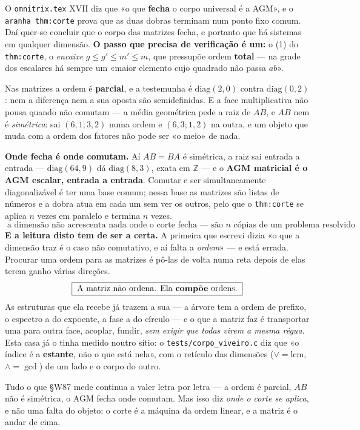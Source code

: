 \documentclass[11pt,a4paper]{article}
\newcommand{\code}[1]{\texttt{\small #1}}
\newcommand{\Z}{\ensuremath{\mathbb{Z}}}
\begin{document}
\noindent O \code{omnitrix.tex} XVII diz que «o que \textbf{fecha} o corpo universal
é a AGM», e o \code{aranha thm:corte} prova que as duas dobras terminam num ponto
fixo comum. Daí quer-se concluir que o corpo das matrizes fecha, e portanto que há
sistemas em qualquer dimensão. \textbf{O passo que precisa de verificação é um:} o
(1) do \code{thm:corte}, o \emph{encaixe} $g\le g'\le m'\le m$, que pressupõe ordem
\textbf{total} --- na grade dos escalares há sempre um «maior elemento cujo quadrado
não passa $ab$».

\medskip\noindent Nas matrizes a ordem é \textbf{parcial}, e a testemunha é
$\mathrm{diag}(2,0)$ contra $\mathrm{diag}(0,2)$: nem a diferença nem a sua oposta
são semidefinidas. E a face multiplicativa não pousa quando não comutam --- a média
geométrica pede a raiz de $AB$, e $AB$ nem é \emph{simétrica}: sai $(6,1;3,2)$ numa
ordem e $(6,3;1,2)$ na outra, e um objeto que muda com a ordem dos fatores não pode
ser «o meio» de nada.

\medskip\noindent\textbf{Onde fecha é onde comutam.} Aí $AB=BA$ é simétrica, a raiz
sai entrada a entrada --- $\mathrm{diag}(64,9)$ dá $\mathrm{diag}(8,3)$, exata em
$\Z$ --- e o \textbf{AGM matricial é o AGM escalar, entrada a entrada}. Comutar e ser
simultaneamente diagonalizável é ter uma base comum; nessa base as matrizes são
listas de números e a dobra atua em cada um sem ver os outros, pelo que o
\code{thm:corte} se aplica $n$ vezes em paralelo e termina $n$ vezes.
\[
\boxed{\;\text{a dimensão não acrescenta nada onde o corte fecha --- são }n\text{ cópias de um problema resolvido}\;}
\]
\medskip\noindent\textbf{E a leitura disto tem de ser a certa.} A primeira que
escrevi dizia «o que a dimensão traz é o caso não comutativo, e aí falta a
\emph{ordem}» --- e está errada. Procurar uma ordem para as matrizes é pô-las de
volta numa reta depois de elas terem ganho várias direções.
\[
\boxed{\;\text{A matriz não ordena. Ela \textbf{compõe} ordens.}\;}
\]
As estruturas que ela recebe já trazem a sua --- a árvore tem a ordem de prefixo, o
espectro a do expoente, a fase a do círculo --- e o que a matriz faz é transportar
uma para outra face, acoplar, fundir, \emph{sem exigir que todas virem a mesma
régua}. Esta casa já o tinha medido noutro sítio: o \code{tests/corpo\_viveiro.c}
diz que «o índice é a \textbf{estante}, não o que está nela», com o retículo das
dimensões ($\vee=\mathrm{lcm}$, $\wedge=\gcd$) de um lado e o corpo do outro.

\medskip\noindent Tudo o que §W87 mede continua a valer letra por letra --- a ordem é
parcial, $AB$ não é simétrica, o AGM fecha onde comutam. Mas isso diz \emph{onde o
corte se aplica}, e não uma falta do objeto: o corte é a máquina da ordem linear, e
a matriz é o andar de cima.
\end{document}
